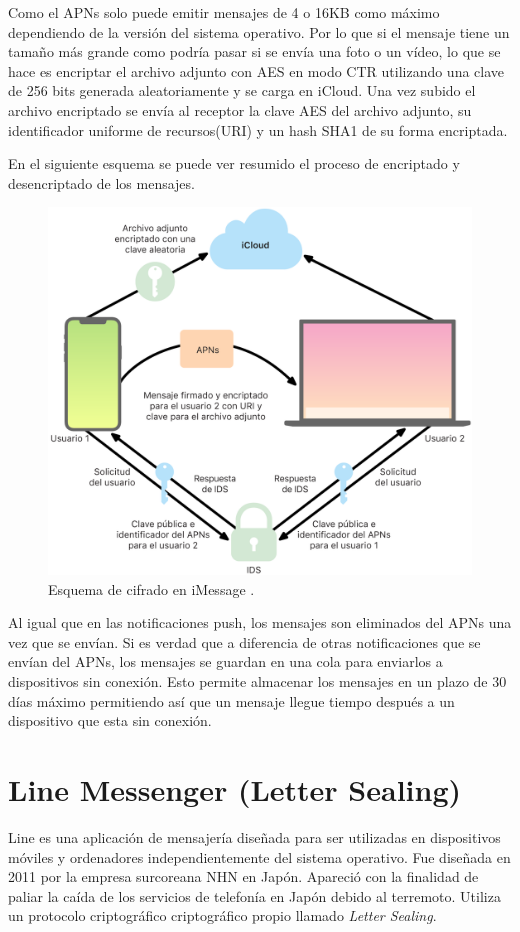 Como el APNs solo puede emitir mensajes de 4 o 16KB como máximo dependiendo de la versión del sistema operativo. Por lo que si el mensaje tiene un tamaño más grande como podría pasar si se envía una foto o un vídeo, lo que se hace es encriptar el archivo adjunto con AES en modo CTR utilizando una clave de 256 bits generada aleatoriamente y se carga en iCloud. Una vez subido el archivo encriptado se envía al receptor la clave AES del archivo adjunto, su identificador uniforme de recursos(URI) y un hash SHA1 de su forma encriptada.

En el siguiente esquema se puede ver resumido el proceso de encriptado y desencriptado de los mensajes.
\begin{figure}[htb]
	\centering
	\includegraphics[scale=0.15]{imagenes/apple.png} 
	\caption{Esquema de cifrado en iMessage \cite{apple1}.}
	\label{iMessagefoto}
\end{figure}

Al igual que en las notificaciones push, los mensajes son eliminados del APNs una vez que se envían. Si es verdad que a diferencia de otras notificaciones que se envían del APNs, los mensajes se guardan en una cola para enviarlos a dispositivos sin conexión. Esto permite almacenar los mensajes en un plazo de 30 días máximo permitiendo así que un mensaje llegue tiempo después a un dispositivo que esta sin conexión.

\section{Line Messenger (Letter Sealing)}
Line es una aplicación de mensajería diseñada para ser utilizadas en dispositivos móviles y ordenadores independientemente del sistema operativo. Fue diseñada en 2011 por la empresa surcoreana NHN en Japón.
Apareció con la finalidad de paliar la caída de los servicios de telefonía en Japón debido al terremoto. Utiliza un protocolo criptográfico criptográfico propio llamado \emph{Letter Sealing}.

